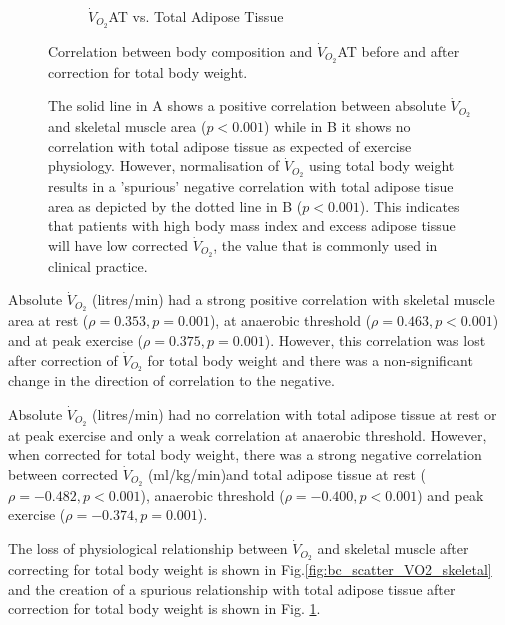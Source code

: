 \begin{figure}[htb]
\begin{subfigure}[b]{0.45\textwidth}
		\caption{$\dot{V}_{O_2}$AT vs. Total Adipose Tissue}
		\label{fig:bc_scatter_VO2_TAT}
	\end{subfigure}
	\caption{Correlation between body composition and $\dot{V}_{O_2}$AT before and after correction for total body weight.}
	\caption*{%
	 The solid line in A shows a positive correlation between absolute $\dot{V}_{O_2}$ and skeletal muscle area ($p<0.001$) while in B it shows no correlation with total adipose tissue as expected of exercise physiology. However, normalisation of $\dot{V}_{O_2}$ using total body weight results in a 'spurious' negative correlation with total adipose tisue area as depicted by the dotted line in B ($p<0.001$). This indicates that patients with high body mass index and excess adipose tissue will have low corrected $\dot{V}_{O_2}$, the value that is commonly used in clinical practice.}	
	\label{fig:bc_scatter_VO2_bodycomp_reversal}
\end{figure}

Absolute $\dot{V}_{O_2}$ (litres/min) had a strong positive correlation with skeletal muscle area at rest ($\rho = 0.353, p = 0.001$), at anaerobic threshold ($\rho = 0.463, p<0.001$) and at peak exercise ($\rho = 0.375, p = 0.001$). 
However, this correlation was lost after correction of $\dot{V}_{O_2}$ for total body weight and there was a non-significant change in the direction of correlation to the negative.

Absolute $\dot{V}_{O_2}$ (litres/min) had no correlation with total adipose tissue at rest or at peak exercise and only a weak correlation at anaerobic threshold. 
However, when corrected for total body weight, there was a strong negative correlation between corrected $\dot{V}_{O_2}$ (ml/kg/min)and total adipose tissue at rest ($\rho = -0.482, p<0.001$), anaerobic threshold ($\rho = -0.400, p<0.001$) and peak exercise ($\rho = -0.374, p = 0.001$).

The loss of physiological relationship between $\dot{V}_{O_2}$ and skeletal muscle after correcting for total body weight is shown in Fig.\ref{fig:bc_scatter_VO2_skeletal} and the creation of a spurious relationship with total adipose tissue after correction for total body weight is shown in Fig. \ref{fig:bc_scatter_VO2_TAT}.

